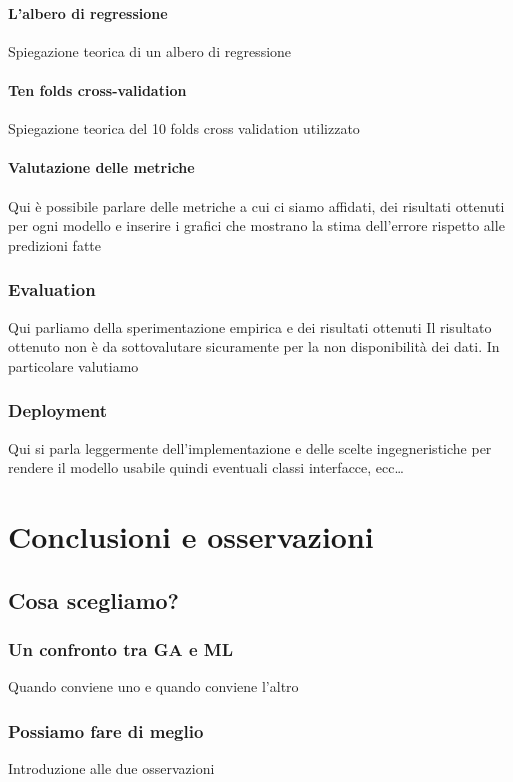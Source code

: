 \documentclass[a4paper, 11pt, oneside]{report}
\begin{document}
                \subsection{L'albero di regressione}
                Spiegazione teorica di un albero di regressione
                \subsection{Ten folds cross-validation}
                Spiegazione teorica del 10 folds cross validation utilizzato
                \subsection{Valutazione delle metriche}
                Qui è possibile parlare delle metriche a cui ci siamo affidati, dei risultati ottenuti per ogni modello
                e inserire i grafici che mostrano la stima dell'errore rispetto alle predizioni fatte

            \section{Evaluation}
            Qui parliamo della sperimentazione empirica e dei risultati ottenuti
            Il risultato ottenuto non è da sottovalutare sicuramente per la non disponibilità dei dati.
            In particolare valutiamo

            \section{Deployment}
            Qui si parla leggermente dell'implementazione e delle scelte ingegneristiche per rendere il modello usabile
            quindi eventuali classi interfacce, ecc\ldots


    \part{Conclusioni e osservazioni}
        \chapter{Cosa scegliamo?}
            \section{Un confronto tra GA e ML}
                Quando conviene uno e quando conviene l'altro
            \section{Possiamo fare di meglio}
                Introduzione alle due osservazioni
\end{document}
